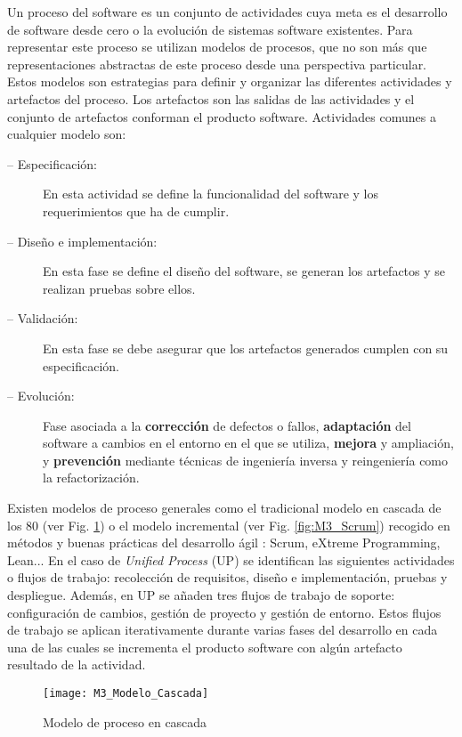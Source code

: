 Un proceso del software es un conjunto de actividades cuya meta es el desarrollo de software desde cero o la evolución de sistemas software existentes. Para representar este proceso se utilizan modelos de procesos, que no son más que representaciones abstractas de este proceso desde una perspectiva particular. Estos modelos son estrategias para definir y organizar las diferentes actividades y artefactos del proceso. Los artefactos son las salidas de las actividades y el conjunto de artefactos conforman el producto software. Actividades comunes a cualquier modelo son:
\begin{description}
	\item[-- Especificación:] En esta actividad se define la funcionalidad del software y los requerimientos que ha de cumplir.
	\item[-- Diseño e implementación:] En esta fase se define el diseño del software, se generan los artefactos y se realizan pruebas sobre ellos.
	\item[-- Validación:] En esta fase se debe asegurar que los artefactos generados cumplen con su especificación.
	\item[-- Evolución:] Fase asociada a la \textbf{corrección} de defectos o fallos, \textbf{adaptación} del software a cambios en el entorno en el que se utiliza, \textbf{mejora} y ampliación, y \textbf{prevención} mediante técnicas de ingeniería inversa y reingeniería como la refactorización.
\end{description}

Existen modelos de proceso generales como el tradicional modelo en cascada de los 80 (ver Fig. \ref{fig:M3_Modelo_Cascada}) o el modelo incremental (ver Fig. \ref{fig:M3_Scrum}) recogido en métodos y buenas prácticas del desarrollo ágil \citep{scrum_master_scrum_2019}: Scrum, eXtreme Programming, Lean... En el caso de  \textit{Unified Process} (UP) \citep{jacobson_proceso_2000} se identifican las siguientes actividades o flujos de trabajo: recolección de requisitos, diseño e implementación, pruebas y despliegue. Además, en UP se añaden tres flujos de trabajo de soporte: configuración de cambios, gestión de proyecto y gestión de entorno. Estos flujos de trabajo se aplican iterativamente durante varias fases del desarrollo en cada una de las cuales se incrementa el producto software con algún artefacto resultado de la actividad.

\begin{figure}[!h]
	\centering
	\texttt{[image: M3\_Modelo\_Cascada]}
	\caption{Modelo de proceso en cascada \citep{wikipedia_software_2019}}
	\label{fig:M3_Modelo_Cascada}
\end{figure}
\FloatBarrier

